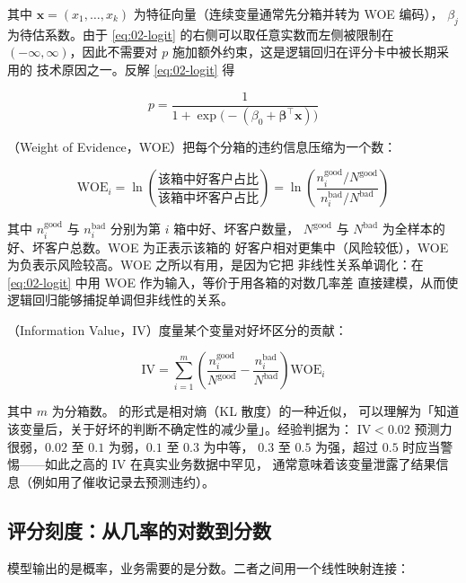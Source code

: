 其中 $\mathbf{x} = (x_1,\dots,x_k)$ 为特征向量（连续变量通常先分箱并转为 WOE 编码），
$\beta_j$ 为待估系数。由于 \cref{eq:02-logit} 的右侧可以取任意实数而左侧被限制在
$(-\infty,\infty)$，因此不需要对 $p$ 施加额外约束，这是逻辑回归在评分卡中被长期采用的
技术原因之一。反解 \cref{eq:02-logit} 得

\begin{equation}\label{eq:02-pd}
  p = \frac{1}{1 + \exp\bigl(-(\beta_0 + \boldsymbol{\beta}^{\top}\mathbf{x})\bigr)}
\end{equation}

（Weight of Evidence，WOE）把每个分箱的违约信息压缩为一个数：

\begin{equation}\label{eq:02-woe}
  \mathrm{WOE}_i = \ln\!\left(\frac{\text{该箱中好客户占比}}{\text{该箱中坏客户占比}}\right)
                 = \ln\!\left(\frac{n_i^{\text{good}}/N^{\text{good}}}{n_i^{\text{bad}}/N^{\text{bad}}}\right)
\end{equation}

其中 $n_i^{\text{good}}$ 与 $n_i^{\text{bad}}$ 分别为第 $i$ 箱中好、坏客户数量，
$N^{\text{good}}$ 与 $N^{\text{bad}}$ 为全样本的好、坏客户总数。WOE 为正表示该箱的
好客户相对更集中（风险较低），WOE 为负表示风险较高。WOE 之所以有用，是因为它把
非线性关系单调化：在 \cref{eq:02-logit} 中用 WOE 作为输入，等价于用各箱的对数几率差
直接建模，从而使逻辑回归能够捕捉单调但非线性的关系。

（Information Value，IV）度量某个变量对好坏区分的贡献：

\begin{equation}\label{eq:02-iv}
  \mathrm{IV} = \sum_{i=1}^{m}\left(\frac{n_i^{\text{good}}}{N^{\text{good}}}
              - \frac{n_i^{\text{bad}}}{N^{\text{bad}}}\right)\mathrm{WOE}_i
\end{equation}

其中 $m$ 为分箱数。 的形式是相对熵（KL 散度）的一种近似，
可以理解为「知道该变量后，关于好坏的判断不确定性的减少量」。经验判据为：
$\mathrm{IV} < 0.02$ 预测力很弱，$0.02$ 至 $0.1$ 为弱，$0.1$ 至 $0.3$ 为中等，
$0.3$ 至 $0.5$ 为强，超过 $0.5$ 时应当警惕——如此之高的 IV 在真实业务数据中罕见，
通常意味着该变量泄露了结果信息（例如用了催收记录去预测违约）。

\subsection{评分刻度：从几率的对数到分数}

模型输出的是概率，业务需要的是分数。二者之间用一个线性映射连接：

